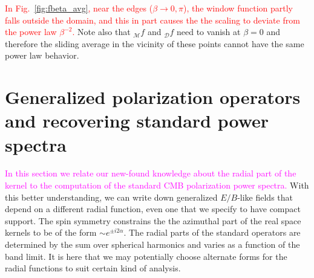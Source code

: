 \documentclass[a4paper,11pt]{article}
\newcommand{\mm}{\mathcal{M}}
\newcommand{\md}{\mathcal{D}}
\def\fig#1{{Fig.~\ref{#1}}}
\newcommand{\revisit}{\textcolor{red}}
\newcommand{\addtext}{\textcolor{magenta}  }
\begin{document}
\revisit{In \fig{fig:fbeta_avg}, near the edges ($\beta \rightarrow 0,\pi$), the window function partly falls outside the domain, and this in part causes the the scaling to deviate from the power law $\beta^{-2}$.}  Note also that ${}_{\mm}f$ and ${}_{\md}f$ need to vanish at $\beta=0$ and therefore the sliding average in the vicinity of these points cannot have the same power law behavior.
%
\section{Generalized polarization operators and recovering standard power spectra}\label{sec:generalized_operators}  
\addtext{In this section we relate our new-found knowledge about the radial part of the kernel to the computation of the standard CMB polarization power spectra.} With this better understanding, we can write down generalized $E/B$-like fields that depend on a different radial function, even one that we specify to have compact support.
The spin symmetry constrains the the azimuthal part of the real space kernels to be of the form $\sim e^{\pm i2 \alpha}$.  The radial parts of the standard operators are determined by the sum over spherical harmonics and varies as a function of the band limit. It is here that we may potentially choose alternate forms for the radial functions to suit certain kind of analysis.
\end{document}
